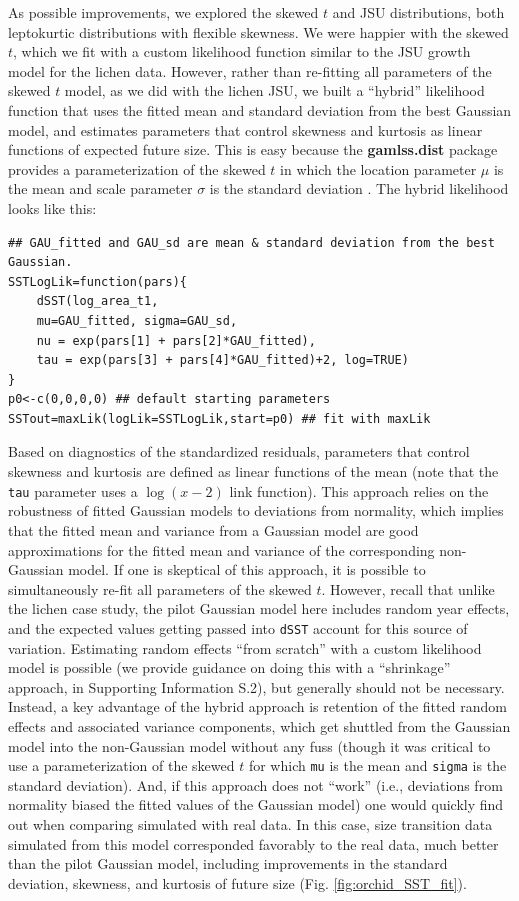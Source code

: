 \documentclass[12pt]{article}
\begin{document}
\begin{spacing}{1.9}
As possible improvements, we explored the skewed $t$ and JSU distributions, both leptokurtic distributions with flexible skewness. 
We were happier with the skewed $t$, which we fit with a custom likelihood function similar to the JSU growth model for the lichen data. 
However, rather than re-fitting all parameters of the skewed $t$ model, as we did with the lichen JSU, we built a ``hybrid'' likelihood function that uses the fitted mean and standard deviation from the best Gaussian model, and estimates parameters that control skewness and kurtosis as linear functions of expected future size. 
This is easy because the \textbf{gamlss.dist} package provides a parameterization of the skewed $t$ in which the location parameter $\mu$ is the mean and scale parameter $\sigma$ is the standard deviation \citep{rigby2019distributions}. 
The hybrid likelihood looks like this:
\begin{lstlisting}
## GAU_fitted and GAU_sd are mean & standard deviation from the best Gaussian.
SSTLogLik=function(pars){
	dSST(log_area_t1, 
	mu=GAU_fitted, sigma=GAU_sd,
	nu = exp(pars[1] + pars[2]*GAU_fitted),
	tau = exp(pars[3] + pars[4]*GAU_fitted)+2, log=TRUE)
}
p0<-c(0,0,0,0) ## default starting parameters
SSTout=maxLik(logLik=SSTLogLik,start=p0) ## fit with maxLik
\end{lstlisting}
Based on diagnostics of the standardized residuals, parameters that control skewness and kurtosis are defined as linear functions of the mean (note that the \verb|tau| parameter uses a $\log(x-2)$ link function). 
This approach relies on the robustness of fitted Gaussian models to deviations from normality, which implies that the fitted mean and variance from a Gaussian model are good approximations for the fitted mean and variance of the corresponding non-Gaussian model. 
If one is skeptical of this approach, it is possible to simultaneously re-fit all parameters of the skewed $t$. 
However, recall that unlike the lichen case study, the pilot Gaussian model here includes random year effects, and the expected values getting passed into \verb|dSST| account for this source of variation. 
Estimating random effects ``from scratch'' with a custom likelihood model is possible (we provide guidance on doing this with a ``shrinkage'' approach, in Supporting Information S.2), but generally should not be necessary. 
Instead, a key advantage of the hybrid approach is retention of the fitted random effects and associated variance components, which get shuttled from the Gaussian model into the non-Gaussian model without any fuss (though it was critical to use a parameterization of the skewed $t$ for which \verb|mu| is the mean and \verb|sigma| is the standard deviation). 
And, if this approach does not ``work'' (i.e., deviations from normality biased the fitted values of the Gaussian model) one would quickly find out when comparing simulated with real data. 
In this case, size transition data simulated from this model corresponded favorably to the real data, much better than the pilot Gaussian model, including improvements in the standard deviation, skewness, and kurtosis of future size (Fig. \ref{fig:orchid_SST_fit}). 


\end{spacing}
\end{document}
